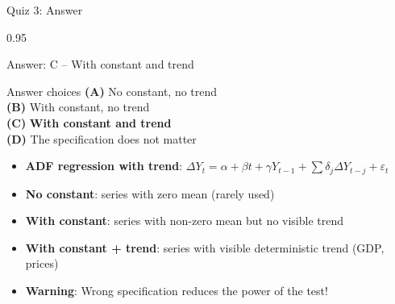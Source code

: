 \documentclass[9pt, aspectratio=169, t]{beamer}
\begin{document}
\begin{frame}{Quiz 3: Answer}
    \begin{cminipage}{0.95\textwidth}
    {\small
    \begin{exampleblock}{Answer: C -- With constant and trend}

        \vspace{0.1cm}

    \begin{block}{Answer choices}
        \textcolor{MainBlue}{\textbf{(A)}} No constant, no trend \incorrect\\[3pt]
        \textcolor{MainBlue}{\textbf{(B)}} With constant, no trend \incorrect\\[3pt]
        \textcolor{MainBlue}{\textbf{(C)}} \textbf{\textcolor{Forest}{With constant and trend}} \correct\\[3pt]
        \textcolor{MainBlue}{\textbf{(D)}} The specification does not matter \incorrect
    \end{block}

        \vspace{0.2cm}

        \begin{itemize}
            \item \textbf{ADF regression with trend}: $\Delta Y_t = \alpha + \beta t + \gamma Y_{t-1} + \sum \delta_j \Delta Y_{t-j} + \varepsilon_t$
            \item \textbf{No constant}: series with zero mean (rarely used)
            \item \textbf{With constant}: series with non-zero mean but no visible trend
            \item \textbf{With constant + trend}: series with visible deterministic trend (GDP, prices)
            \item \textbf{Warning}: Wrong specification reduces the power of the test!
        \end{itemize}
    \end{exampleblock}
    }

    \end{cminipage}
\end{frame}
\end{document}
